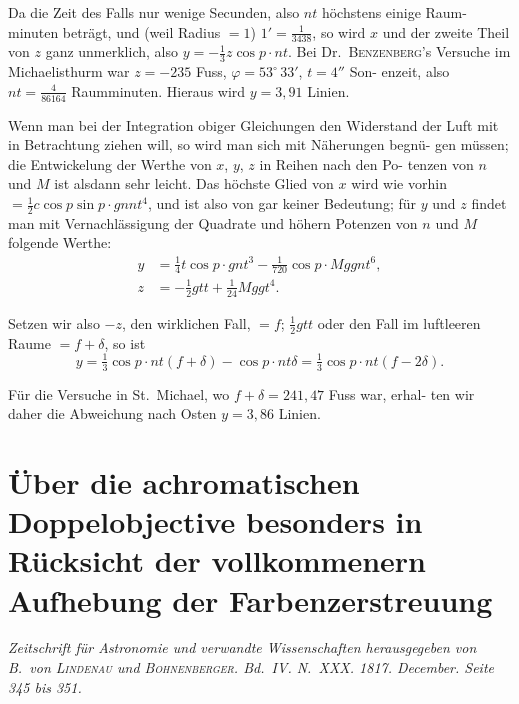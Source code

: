 \documentclass[12pt,a4paper]{article}
\begin{document}
Da die Zeit des Falls nur wenige Secunden, also $nt$ höchstens einige Raum-
minuten beträgt, und (weil Radius $= 1$) $1' = \tfrac{1}{3438}$, so wird $x$ und der zweite 
Theil von $z$ ganz unmerklich, also $y = -\tfrac{1}{3}z\cos p\cdot nt$. Bei Dr.\ \textsc{Benzenberg}'s 
Versuche im Michaelisthurm war $z = -235$ Fuss, $\varphi = 53^\circ\,33'$, $t = 4''$ Son-
enzeit, also $nt = \tfrac{4}{86164}$ Raumminuten. Hieraus wird $y = 3{,}91$ Linien.

Wenn man bei der Integration obiger Gleichungen den Widerstand der 
Luft mit in Betrachtung ziehen will, so wird man sich mit Näherungen begnü-
gen müssen; die Entwickelung der Werthe von $x$, $y$, $z$ in Reihen nach den Po-
tenzen von $n$ und $M$ ist alsdann sehr leicht. Das höchste Glied von $x$ wird 
wie vorhin $= \tfrac{1}{2}c\cos p\sin p\cdot gnnt^4$, und ist also von gar keiner Bedeutung; für 
$y$ und $z$ findet man mit Vernachlässigung der Quadrate und höhern Potenzen 
von $n$ und $M$ folgende Werthe:
\begin{align*}
y &= \tfrac{1}{4}t\cos p\cdot gnt^3 - \tfrac{1}{720}\cos p\cdot Mggnt^6,\\
z &= -\tfrac{1}{2}gtt + \tfrac{1}{24}Mggt^4.
\end{align*}

Setzen wir also $-z$, den wirklichen Fall, $= f$; $\tfrac{1}{2}gtt$ oder den Fall im 
luftleeren Raume $= f + \delta$, so ist
\[
y = \tfrac{1}{3}\cos p\cdot nt(f + \delta) - \cos p\cdot nt\delta = \tfrac{1}{3}\cos p\cdot nt(f - 2\delta).
\]

Für die Versuche in St.\ Michael, wo $f + \delta = 241{,}47$ Fuss war, erhal-
ten wir daher die Abweichung nach Osten $y = 3{,}86$ Linien.

\newpage
\section*{Über die achromatischen Doppelobjective besonders in Rücksicht der vollkommenern Aufhebung der Farbenzerstreuung}

\textit{Zeitschrift für Astronomie und verwandte Wissenschaften herausgegeben von 
B.\ von \textsc{Lindenau} und \textsc{Bohnenberger}. Bd.\ IV. N.\ XXX. 1817. December. Seite 345 bis 351.}
\end{document}

